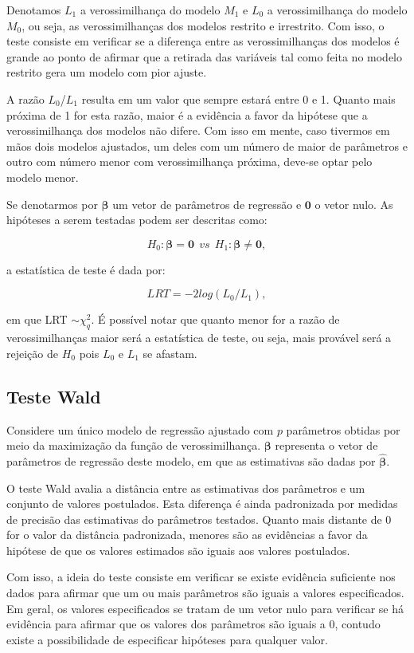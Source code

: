 Denotamos $L_1$ a verossimilhança do modelo $M_1$ e $L_0$ a verossimilhança do modelo $M_0$, ou seja, as verossimilhanças dos modelos restrito e irrestrito. Com isso, o teste consiste em verificar se a diferença entre as verossimilhanças dos modelos é grande ao ponto de afirmar que a retirada das variáveis tal como feita no modelo restrito gera um modelo com pior ajuste.

A razão $L_0$/$L_1$ resulta em um valor que sempre estará entre 0 e 1. Quanto mais próxima de 1 for esta razão, maior é a evidência a favor da hipótese que a verossimilhança dos modelos não difere. Com isso em mente, caso tivermos em mãos dois modelos ajustados, um deles com um número de maior de parâmetros e outro com número menor com verossimilhança próxima, deve-se optar pelo modelo menor.

Se denotarmos por $\boldsymbol{\beta}$ um vetor de parâmetros de regressão e $\boldsymbol{0}$ o vetor nulo. As hipóteses a serem testadas podem ser descritas como:

$$
H_0: \boldsymbol{\beta} = \boldsymbol{0} \: \:  vs \: \:  H_1: \boldsymbol{\beta} \neq \boldsymbol{0},
$$

\noindent a estatística de teste é dada por:

$$
LRT = -2log\left ( L_0/L_1 \right ),
$$

\noindent em que LRT $\sim \chi^2_q$. É possível notar que quanto menor for a razão de verossimilhanças maior será a estatística de teste, ou seja, mais provável será a rejeição de $H_0$ pois $L_0$ e $L_1$ se afastam.

\subsection{Teste Wald}

Considere um único modelo de regressão ajustado com $p$ parâmetros obtidas por meio da maximização da função de verossimilhança. $\boldsymbol{\beta}$ representa o vetor de parâmetros de regressão deste modelo, em que as estimativas são dadas por $\boldsymbol{\hat\beta}$.

O teste Wald avalia a distância entre as estimativas dos parâmetros e um conjunto de valores postulados. Esta diferença é ainda padronizada por medidas de precisão das estimativas do parâmetros testados. Quanto mais distante de 0 for o valor da distância padronizada, menores são as evidências a favor da hipótese de que os valores estimados são iguais aos valores postulados.

Com isso, a ideia do teste consiste em verificar se existe evidência suficiente nos dados para afirmar que um ou mais parâmetros são iguais a valores especificados. Em geral, os valores especificados se tratam de um vetor nulo para verificar se há evidência para afirmar que os valores dos parâmetros são iguais a 0, contudo existe a possibilidade de especificar hipóteses para qualquer valor.

